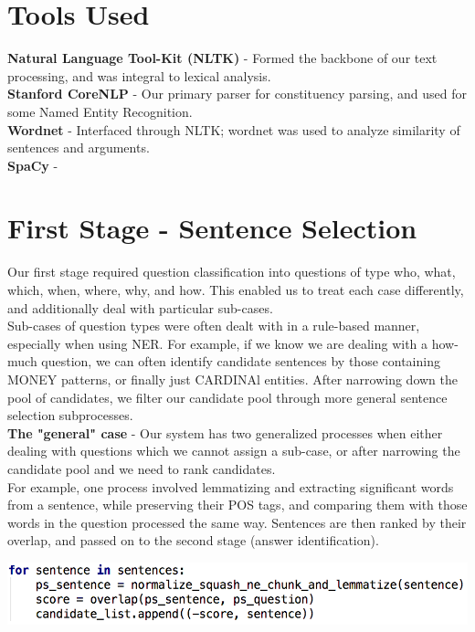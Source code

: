 \documentclass[a1,landscape]{a0poster}
\begin{document}
\begin{multicols}{3}
\color{DarkSlateGray} %

\section*{\LARGE Tools Used}
\textbf{Natural Language Tool-Kit (NLTK)} - Formed the backbone of our text processing, and was integral to lexical analysis. \\
\textbf{Stanford CoreNLP} - Our primary parser for constituency parsing, and used for some Named Entity Recognition.\\
\textbf{Wordnet} - Interfaced through NLTK; wordnet was used to analyze similarity of sentences and arguments. \\
\textbf{SpaCy} - 


\section*{\LARGE First Stage - Sentence Selection}
Our first stage required question classification into questions of type who, what, which, when, where, why, and how. This enabled us to treat each case differently, and additionally deal with particular sub-cases. \\
Sub-cases of question types were often dealt with in a rule-based manner, especially when using NER. For example, if we know we are dealing with a how-much question, we can often identify candidate sentences by those containing MONEY patterns, or finally just CARDINAl entities. After narrowing down the pool of candidates, we filter our candidate pool through more general sentence selection subprocesses. \\
\textbf{The "general" case} - Our system has two generalized processes when either dealing with questions which we cannot assign a sub-case, or after narrowing the candidate pool and we need to rank candidates.\\ For example, one process involved lemmatizing and extracting significant words from a sentence, while preserving their POS tags, and comparing them with those words in the question processed the same way. Sentences are then ranked by their overlap, and passed on to the second stage (answer identification).
\begin{center}\vspace{1cm}
\includegraphics[width=0.85\linewidth]{snippet1.png}
\end{center}\vspace{1cm}


\end{multicols}
\end{document}
